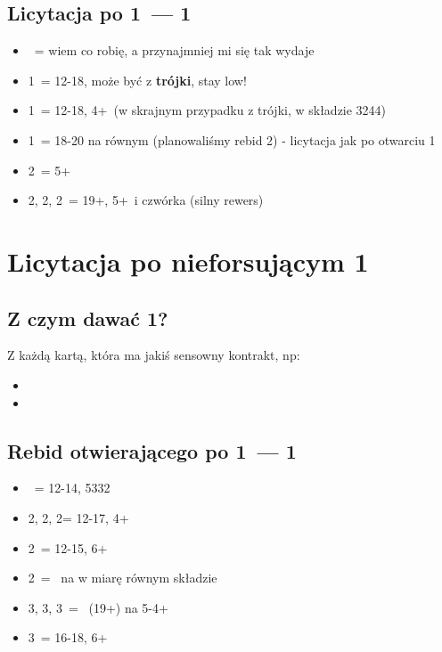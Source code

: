 \documentclass[12pt, a4paper]{article}
\begin{document}
\subsection*{Licytacja po 1\clubs\ --- 1\diams}
\begin{itemize}
    \item \pass\ = wiem co robię, a przynajmniej mi się tak wydaje
    \item 1\hearts\ = 12-18, może być z \textbf{trójki}, stay low!
    \item 1\spades\ = 12-18, 4+\spades\ (w skrajnym przypadku z trójki, w składzie 3244)
    \item 1\nt\ = 18-20 na równym (planowaliśmy rebid 2\nt) - licytacja jak po otwarciu 1\nt
    \item 2\clubs\ = 5+\clubs
    \item 2\diams, 2\hearts, 2\spades\ = 19+, 5+\clubs\ i czwórka (silny rewers)
\end{itemize}


\pagebreak
\section{Licytacja po nieforsującym 1\ntx}
\subsection*{Z czym dawać 1\ntx?}
\begin{formal}
    Z każdą kartą, która ma jakiś sensowny kontrakt, np:
    \begin{itemize}
        \item {}
        \item {}
    \end{itemize}
\end{formal}
\subsection*{Rebid otwierającego po 1\spades\ --- 1\ntx}
\begin{itemize}
    \item \pass\ = 12-14, 5332
    \item 2\clubs, 2\diams, 2\hearts = 12-17, 4+\clubs\diams\hearts
    \item 2\spades\ = 12-15, 6+\spades
    \item 2\nt\ = \gf\ na w miarę równym składzie 
    \item 3\clubs, 3\diams, 3\hearts\ = \gf\ (19+) na 5-4+
    \item 3\spades\ = 16-18, 6+\spades
\end{itemize}
\end{document}
